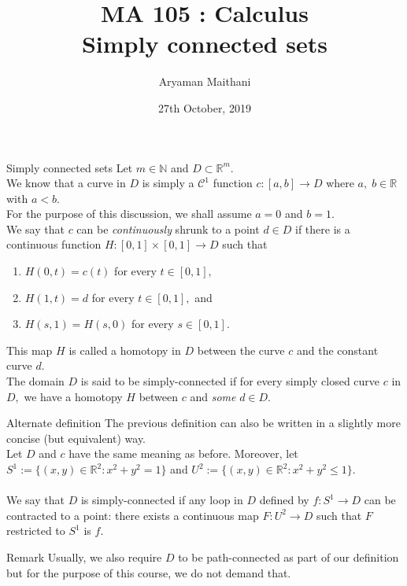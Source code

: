 \documentclass[handout, aspectratio=169]{beamer}
\title{MA 105 : Calculus\\ Simply connected sets}  %
\author{Aryaman Maithani}
\date[27-10-2019]{27th October, 2019}               %
\institute[IITB]{IIT Bombay}
\begin{document}
\begin{frame}
	\titlepage
\end{frame}
\begin{frame}{Simply connected sets}
	Let $m \in \mathbb{N}$ and $D \subset \mathbb{R}^m.$\\
	We know that a curve in $D$ is simply a $\mathcal{C}^1$ function $c:[a, b]\to D$ where $a,\;b\in\mathbb{R}$ with $a < b.$\\
	For the purpose of this discussion, we shall assume $a = 0$ and $b = 1.$\\
	We say that $c$ can be \emph{continuously} shrunk to a point $d \in D$ if there is a continuous function $H:[0, 1]\times[0, 1]\to D$ such that
	\begin{enumerate} 
		\item $H(0, t) = c(t)$ for every $t \in [0, 1],$
		\item $H(1, t) = d$ for every $t \in [0, 1],$ and
		\item $H(s, 1) = H(s, 0)$ for every $s \in [0, 1].$
	\end{enumerate}
	This map $H$ is called a homotopy in $D$ between the curve $c$ and the constant curve $d.$\\
	The domain $D$ is said to be simply-connected if for every simply closed curve $c$ in $D,$ we have a homotopy $H$ between $c$ and \emph{some} $d \in D.$
\end{frame}
\begin{frame}{Alternate definition}
	The previous definition can also be written in a slightly more concise (but equivalent) way.\\
	Let $D$ and $c$ have the same meaning as before. Moreover, let $S^1 := \{(x, y) \in \mathbb{R}^2 : x^2 + y^2 = 1\}$ and $U^2 := \{(x, y) \in \mathbb{R}^2 : x^2 + y^2 \le 1\}.$\\~\\
	We say that $D$ is simply-connected if any loop in $D$ defined by $f:S^1 \to D$ can be contracted to a point: there exists a continuous map $F:U^2 \to D$ such that $F$ restricted to $S^1$ is $f.$
\end{frame}
\begin{frame}{Remark}
	Usually, we also require $D$ to be path-connected as part of our definition but for the purpose of this course, we do not demand that.
\end{frame}
\end{document}
